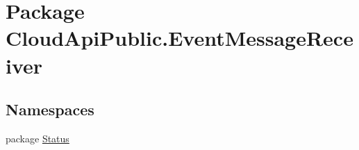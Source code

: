 \hypertarget{namespace_cloud_api_public_1_1_event_message_receiver}{\section{Package Cloud\-Api\-Public.\-Event\-Message\-Receiver}
\label{namespace_cloud_api_public_1_1_event_message_receiver}
}
\subsection*{Namespaces}
\begin{DoxyCompactItemize}
\item 
package \hyperlink{namespace_cloud_api_public_1_1_event_message_receiver_1_1_status}{Status}
\end{DoxyCompactItemize}
